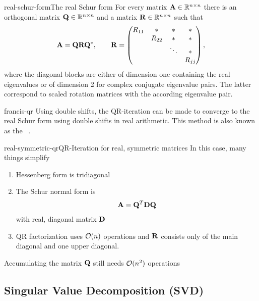 \begin{Theorem*}{real-schur-form}{The real Schur form}
  For every matrix $\mathbf A\in \mathbb R^{n\times n}$ there is an orthogonal matrix
  $\mathbf Q\in\mathbb R^{n\times n}$ and a matrix $\mathbf R\in\mathbb R^{n\times n}$ such that
  \begin{gather}
    \mathbf A = \mathbf Q\mathbf R\mathbf Q^*,
    \qquad
    \mathbf R =
    \begin{pmatrix}
      R_{11} &* & *&*\\
      &R_{22}&*&*\\
      &&\ddots&*\\
      &&& R_{jj}
    \end{pmatrix},
  \end{gather}
  where the diagonal blocks are either of dimension one containing the
  real eigenvalues or of dimension 2 for complex conjugate eigenvalue
  pairs. The latter correspond to scaled rotation matrices with the
  according eigenvalue pair.
\end{Theorem*}

\begin{Remark}{francis-qr}
  Using double shifts, the QR-iteration can be made to converge to the
  real Schur form using double shifts in real arithmetic. This method
  is also known as the ~\cite[Algorithm
  7.5-1]{GolubVanLoan83}.
\end{Remark}

\begin{Remark*}{real-symmetric-qr}{QR-Iteration for real, symmetric matrices}
  In this case, many things simplify
  \begin{enumerate}
  \item Hessenberg form is tridiagonal
  \item The Schur normal form is
    \begin{gather}
      \mathbf A = \mathbf Q^T\mathbf D\mathbf Q
    \end{gather}
    with real, diagonal matrix $\mathbf D$
  \item QR factorization uses $\mathcal O(n)$ operations and $\mathbf R$
    consists only of the main diagonal and one upper diagonal.
  \end{enumerate}
  Accumulating the matrix $\mathbf Q$ still needs $\mathcal O(n^2)$ operations
\end{Remark*}

\subsection{Singular Value Decomposition (SVD)}

